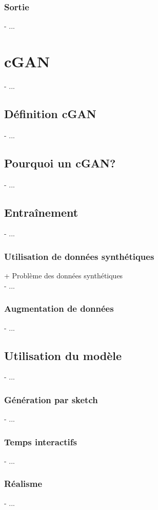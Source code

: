 \subsubsection{Sortie}
- ...
\section{cGAN}
- ...
\subsection{Définition cGAN}
- ...
\subsection{Pourquoi un cGAN?}
- ...
\subsection{Entraînement}
- ...
\subsubsection{Utilisation de données synthétiques}
+ Problème des données synthétiques \\
- ...
\subsubsection{Augmentation de données}
- ...
\subsection{Utilisation du modèle}
- ...
\subsubsection{Génération par sketch}
- ...
\subsubsection{Temps interactifs}
- ...
\subsubsection{Réalisme}
- ...
